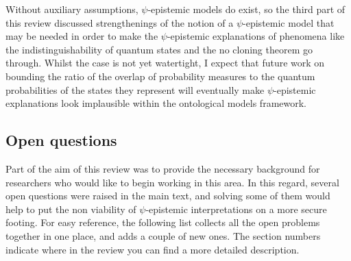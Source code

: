 \documentclass[DIV=calc,paper=a4,fontsize=11pt,twocolumn]{scrartcl} %
\theoremstyle{definition}
\theoremstyle{plain}
\begin{document}
Without auxiliary assumptions, $\psi$-epistemic models do exist, so
the third part of this review discussed strengthenings of the notion
of a $\psi$-epistemic model that may be needed in order to make the
$\psi$-epistemic explanations of phenomena like the
indistinguishability of quantum states and the no cloning theorem go
through.  Whilst the case is not yet watertight, I expect that future
work on bounding the ratio of the overlap of probability measures to
the quantum probabilities of the states they represent will eventually
make $\psi$-epistemic explanations look implausible within the
ontological models framework.

\subsection{Open questions}

Part of the aim of this review was to provide the necessary background
for researchers who would like to begin working in this area.  In this
regard, several open questions were raised in the main text, and
solving some of them would help to put the non viability of
$\psi$-epistemic interpretations on a more secure footing.  For easy
reference, the following list collects all the open problems together
in one place, and adds a couple of new ones.  The section numbers
indicate where in the review you can find a more detailed description.
\end{document}
